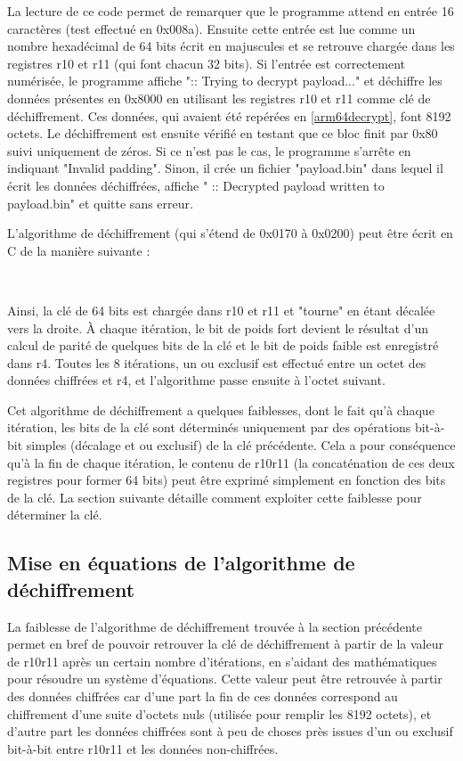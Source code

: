 \documentclass[a4paper,10pt]{article}
\newcommand{\pyinput}[1]{%
    \noindent{\color[rgb]{0.5, 0.5, 0.5}{\rule{\textwidth}{0.4pt}}}
     \\
    \noindent{\color[rgb]{0.5, 0.5, 0.5}{\rule{\textwidth}{0.4pt}}}
}
\begin{document}
La lecture de ce code permet de remarquer que le programme attend en entrée 16 caractères (test effectué en 0x008a). Ensuite cette entrée est lue comme un nombre hexadécimal de 64 bits écrit en majuscules et se retrouve chargée dans les registres r10 et r11 (qui font chacun 32 bits). Si l'entrée est correctement numérisée, le programme affiche ":: Trying to decrypt payload..." et déchiffre les données présentes en 0x8000 en utilisant les registres r10 et r11 comme clé de déchiffrement. Ces données, qui avaient été repérées en \ref{arm64decrypt}, font 8192 octets. Le déchiffrement est ensuite vérifié en testant que ce bloc finit par 0x80 suivi uniquement de zéros. Si ce n'est pas le cas, le programme s'arrête en indiquant "Invalid padding". Sinon, il crée un fichier "payload.bin" dans lequel il écrit les données déchiffrées, affiche " :: Decrypted payload written to payload.bin" et quitte sans erreur.

L'algorithme de déchiffrement (qui s'étend de 0x0170 à 0x0200) peut être écrit en C de la manière suivante :

\pyinput{2_arm64/badbiosrisc_decrypt32.c.inc.tex}

Ainsi, la clé de 64 bits est chargée dans r10 et r11 et "tourne" en étant décalée vers la droite. À chaque itération, le bit de poids fort devient le résultat d'un calcul de parité de quelques bits de la clé et le bit de poids faible est enregistré dans r4. Toutes les 8 itérations, un ou exclusif est effectué entre un octet des données chiffrées et r4, et l'algorithme passe ensuite à l'octet suivant.

Cet algorithme de déchiffrement a quelques faiblesses, dont le fait qu'à chaque itération, les bits de la clé sont déterminés uniquement par des opérations bit-à-bit simples (décalage et ou exclusif) de la clé précédente. Cela a pour conséquence qu'à la fin de chaque itération, le contenu de r10r11 (la concaténation de ces deux registres pour former 64 bits) peut être exprimé simplement en fonction des bits de la clé. La section suivante détaille comment exploiter cette faiblesse pour déterminer la clé.

\subsection{Mise en équations de l'algorithme de déchiffrement}

La faiblesse de l'algorithme de déchiffrement trouvée à la section précédente permet en bref de pouvoir retrouver la clé de déchiffrement à partir de la valeur de r10r11 après un certain nombre d'itérations, en s'aidant des mathématiques pour résoudre un système d'équations. Cette valeur peut être retrouvée à partir des données chiffrées car d'une part la fin de ces données correspond au chiffrement d'une suite d'octets nuls (utilisée pour remplir les 8192 octets), et d'autre part les données chiffrées sont à peu de choses près issues d'un ou exclusif bit-à-bit entre r10r11 et les données non-chiffrées.
\end{document}
